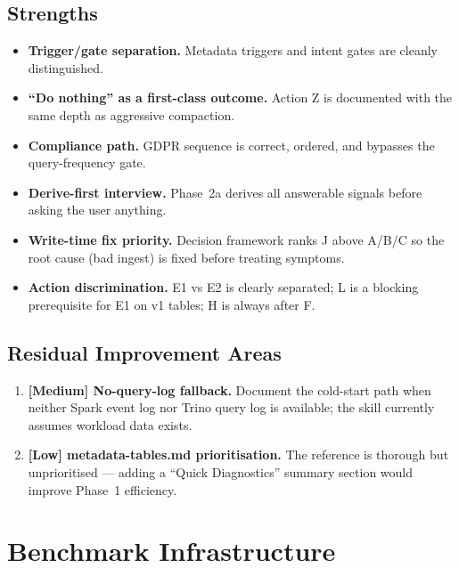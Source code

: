 \documentclass[11pt,a4paper]{article}
\begin{document}
\subsection{Strengths}

\begin{itemize}
  \item \textbf{Trigger/gate separation.}  Metadata triggers and intent gates
        are cleanly distinguished.
  \item \textbf{``Do nothing'' as a first-class outcome.}  Action Z is
        documented with the same depth as aggressive compaction.
  \item \textbf{Compliance path.}  GDPR sequence is correct, ordered, and
        bypasses the query-frequency gate.
  \item \textbf{Derive-first interview.}  Phase~2a derives all answerable
        signals before asking the user anything.
  \item \textbf{Write-time fix priority.}  Decision framework ranks J above
        A/B/C so the root cause (bad ingest) is fixed before treating symptoms.
  \item \textbf{Action discrimination.}  E1 vs E2 is clearly separated; L is
        a blocking prerequisite for E1 on v1 tables; H is always after F.
\end{itemize}

\subsection{Residual Improvement Areas}

\begin{enumerate}
  \item \textbf{[Medium] No-query-log fallback.}  Document the cold-start path
        when neither Spark event log nor Trino query log is available; the skill
        currently assumes workload data exists.
  \item \textbf{[Low] metadata-tables.md prioritisation.}  The reference is
        thorough but unprioritised --- adding a ``Quick Diagnostics'' summary
        section would improve Phase~1 efficiency.
\end{enumerate}

\section{Benchmark Infrastructure}
\end{document}

